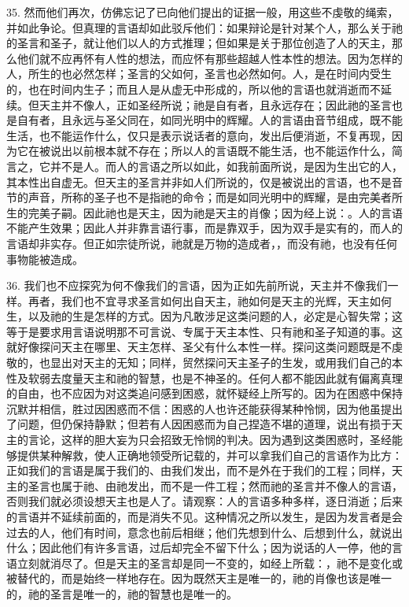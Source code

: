 35. 然而他们再次，仿佛忘记了已向他们提出的证据一般，用这些不虔敬的绳索，并如此争论。但真理的言语却如此驳斥他们：如果辩论是针对某个人，那么关于祂的圣言和圣子，就让他们以人的方式推理；但如果是关于那位创造了人的天主，那么他们就不应再怀有人性的想法，而应怀有那些超越人性本性的想法。因为怎样的人，所生的也必然怎样；圣言的父如何，圣言也必然如何。人，是在时间内受生的，也在时间内生子；而且人是从虚无中形成的，所以他的言语也就消逝而不延续。但天主并不像人，正如圣经所说；祂是自有者，且永远存在；因此祂的圣言也是自有者，且永远与圣父同在，如同光明中的辉耀。人的言语由音节组成，既不能生活，也不能运作什么，仅只是表示说话者的意向，发出后便消逝，不复再现，因为它在被说出以前根本就不存在；所以人的言语既不能生活，也不能运作什么，简言之，它并不是人。而人的言语之所以如此，如我前面所说，是因为生出它的人，其本性出自虚无。但天主的圣言并非如人们所说的，仅是被说出的言语，也不是音节的声音，所称的圣子也不是指祂的命令；而是如同光明中的辉耀，是由完美者所生的完美子嗣。因此祂也是天主，因为祂是天主的肖像；因为经上说：。人的言语不能产生效果；因此人并非靠言语行事，而是靠双手，因为双手是实有的，而人的言语却非实存。但正如宗徒所说，祂就是万物的造成者，，而没有祂，也没有任何事物能被造成。\par

36. 我们也不应探究为何不像我们的言语，因为正如先前所说，天主并不像我们一样。再者，我们也不宜寻求圣言如何出自天主，祂如何是天主的光辉，天主如何生，以及祂的生是怎样的方式。因为凡敢涉足这类问题的人，必定是心智失常；这等于是要求用言语说明那不可言说、专属于天主本性、只有祂和圣子知道的事。这就好像探问天主在哪里、天主怎样、圣父有什么本性一样。探问这类问题既是不虔敬的，也显出对天主的无知；同样，贸然探问天主圣子的生发，或用我们自己的本性及软弱去度量天主和祂的智慧，也是不神圣的。任何人都不能因此就有偏离真理的自由，也不应因为对这类追问感到困惑，就怀疑经上所写的。因为在困惑中保持沉默并相信，胜过因困惑而不信：困惑的人也许还能获得某种怜悯，因为他虽提出了问题，但仍保持静默；但若有人因困惑而为自己捏造不堪的道理，说出有损于天主的言论，这样的胆大妄为只会招致无怜悯的判决。因为遇到这类困惑时，圣经能够提供某种解救，使人正确地领受所记载的，并可以拿我们自己的言语作为比方：正如我们的言语是属于我们的、由我们发出，而不是外在于我们的工程；同样，天主的圣言也属于祂、由祂发出，而不是一件工程；然而祂的圣言并不像人的言语，否则我们就必须设想天主也是人了。请观察：人的言语多种多样，逐日消逝；后来的言语并不延续前面的，而是消失不见。这种情况之所以发生，是因为发言者是会过去的人，他们有时间，意念也前后相继；他们先想到什么、后想到什么，就说出什么；因此他们有许多言语，过后却完全不留下什么；因为说话的人一停，他的言语立刻就消尽了。但是天主的圣言却是同一不变的，如经上所载：，祂不是变化或被替代的，而是始终一样地存在。因为既然天主是唯一的，祂的肖像也该是唯一的，祂的圣言是唯一的，祂的智慧也是唯一的。\par

